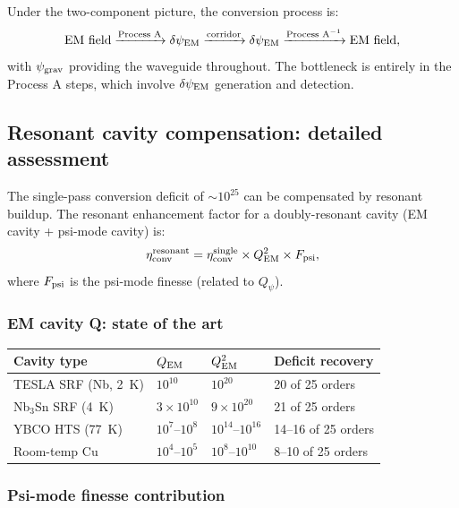 \documentclass[11pt]{article}
\newcommand{\ee}[1]{\times 10^{#1}}
\newcommand{\psigrav}{\psi_{\rm grav}}
\newcommand{\dpsiEM}{\delta\psi_{\rm EM}}
\newcommand{\Qpsi}{Q_\psi}
\begin{document}
Under the two-component picture, the conversion process is:
\begin{equation}
\text{EM field} \xrightarrow{\text{Process A}} \dpsiEM
\xrightarrow{\text{corridor}} \dpsiEM
\xrightarrow{\text{Process A}^{-1}} \text{EM field},
\end{equation}
with $\psigrav$ providing the waveguide throughout. The bottleneck is
entirely in the Process A steps, which involve $\dpsiEM$ generation
and detection.

\subsection{Resonant cavity compensation: detailed assessment}

The single-pass conversion deficit of $\sim 10^{25}$ can be compensated
by resonant buildup. The resonant enhancement factor for a doubly-resonant
cavity (EM cavity + psi-mode cavity) is:
\begin{equation}
\eta_{\rm conv}^{\rm resonant} = \eta_{\rm conv}^{\rm single} \times
Q_{\rm EM}^2 \times F_{\rm psi},
\label{eq:resonant-enhancement}
\end{equation}
where $F_{\rm psi}$ is the psi-mode finesse (related to $\Qpsi$).

\subsubsection{EM cavity Q: state of the art}

\begin{center}
\begin{tabular}{llll}
\toprule
Cavity type & $Q_{\rm EM}$ & $Q_{\rm EM}^2$ & Deficit recovery \\
\midrule
TESLA SRF (Nb, 2~K) & $10^{10}$ & $10^{20}$ & 20 of 25 orders \\
Nb$_3$Sn SRF (4~K) & $3\ee{10}$ & $9\ee{20}$ & 21 of 25 orders \\
YBCO HTS (77~K) & $10^{7}$--$10^{8}$ & $10^{14}$--$10^{16}$ & 14--16 of 25 orders \\
Room-temp Cu & $10^{4}$--$10^{5}$ & $10^{8}$--$10^{10}$ & 8--10 of 25 orders \\
\bottomrule
\end{tabular}
\end{center}

\subsubsection{Psi-mode finesse contribution}
\end{document}
